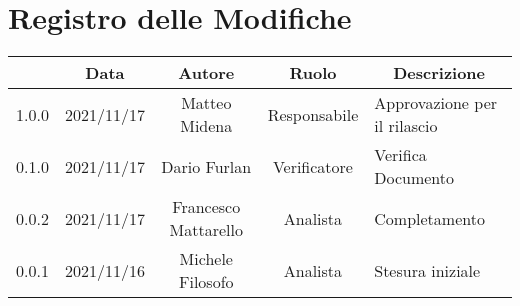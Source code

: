 \thispagestyle{empty}
\section*{Registro delle Modifiche}

\begin{center}
	\renewcommand{\arraystretch}{1.8}
	\begin{longtable}[c]{c | c | c | c | p{5cm}}
		\rowcolor[HTML]{125E28}
		\multicolumn{1}{c}{\color[HTML]{FFFFFF} \textbf{Versione}} & 
		\multicolumn{1}{c}{\color[HTML]{FFFFFF} \textbf{Data}} & 
		\multicolumn{1}{c}{\color[HTML]{FFFFFF} \textbf{Autore}} & 
		\multicolumn{1}{c}{\color[HTML]{FFFFFF} \textbf{Ruolo}} & 
		\multicolumn{1}{c}{\color[HTML]{FFFFFF} \textbf{Descrizione}} \\
		\endhead
		1.0.0 & 2021/11/17 & Matteo Midena & Responsabile & Approvazione per il rilascio \\
		0.1.0 & 2021/11/17 & Dario Furlan & Verificatore & Verifica Documento \\
		0.0.2 & 2021/11/17 & Francesco Mattarello & Analista & Completamento \\
		0.0.1 & 2021/11/16 & Michele Filosofo & Analista & Stesura iniziale \\
	\end{longtable}
\end{center}